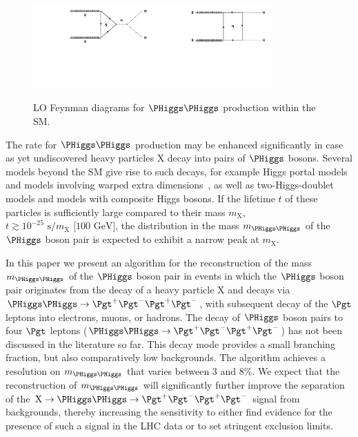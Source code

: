 \begin{figure}
\centering
\includegraphics[width=0.40\textwidth]{figures/feynman_nonresonant_triangle.pdf} \hspace{\fill}
\includegraphics[width=0.40\textwidth]{figures/feynman_nonresonant_box.pdf} \hspace{\fill}
\caption{ LO Feynman diagrams for $\PHiggs\PHiggs$ production within the SM.}
\label{fig:FeynmanDiagrams_smHH}
\end{figure}

The rate for $\PHiggs\PHiggs$ production may be enhanced significantly in case as yet undiscovered heavy particles $\textrm{X}$ decay into pairs of $\PHiggs$ bosons.
Several models beyond the SM give rise to such decays, 
for example Higgs portal models~\cite{Englert:2011yb,No:2013wsa} and models involving warped extra dimensions~\cite{Randall:1999ee},
as well as two-Higgs-doublet models and models with composite Higgs bosons.
If the lifetime $t$ of these particles is sufficiently large compared to their mass $m_{\textrm{X}}$, $t \gtrsim 10^{-25}\textrm{~s}/m_{\textrm{X}}\textrm{~[100~GeV]}$, 
the distribution in the mass $m_{\PHiggs\PHiggs}$ of the $\PHiggs$ boson pair is expected to exhibit a narrow peak at $m_{\textrm{X}}$.

In this paper we present an algorithm for the reconstruction of the mass $m_{\PHiggs\PHiggs}$ of the $\PHiggs$ boson pair 
in events in which the $\PHiggs$ boson pair originates from the decay of a heavy particle $\textrm{X}$ and decays via $\PHiggs\PHiggs \to \Pgt^{+}\Pgt^{-}\Pgt^{+}\Pgt^{-}$,
with subsequent decay of the $\Pgt$ leptons into electrons, muons, or hadrons.
The decay of $\PHiggs$ boson pairs to four $\Pgt$ leptons ($\PHiggs\PHiggs \to \Pgt^{+}\Pgt^{-}\Pgt^{+}\Pgt^{-}$) has not been discussed in the literature so far.
This decay mode provides a small branching fraction, but also comparatively low backgrounds.
The algorithm achieves a resolution on $m_{\PHiggs\PHiggs}$ that varies between $3$ and $8\%$.
We expect that the reconstruction of $m_{\PHiggs\PHiggs}$ will significantly further improve the separation of the $\textrm{X} \to \PHiggs\PHiggs \to \Pgt^{+}\Pgt^{-}\Pgt^{+}\Pgt^{-}$ signal from backgrounds,
thereby increasing the sensitivity to either find evidence for the presence of such a signal in the LHC data or to set stringent exclusion limits.

